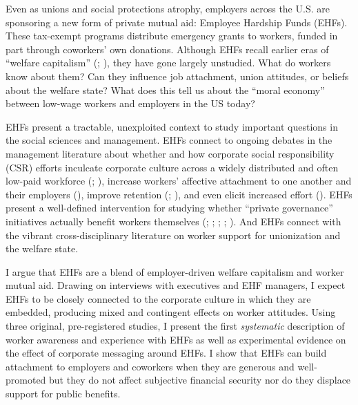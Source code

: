 \documentclass[
  11pt,
  oneside]{article}
\begin{document}
Even as unions and social protections atrophy, employers across the U.S. are sponsoring a new form of private mutual aid: Employee Hardship Funds (EHFs). These tax-exempt programs distribute emergency grants to workers, funded in part through coworkers' own donations. Although EHFs recall earlier eras of ``welfare capitalism'' (; ), they have gone largely unstudied. What do workers know about them? Can they influence job attachment, union attitudes, or beliefs about the welfare state? What does this tell us about the ``moral economy'' between low-wage workers and employers in the US today?

EHFs present a tractable, unexploited context to study important questions in the social sciences and management. EHFs connect to ongoing debates in the management literature about whether and how corporate social responsibility (CSR) efforts inculcate corporate culture across a widely distributed and often low-paid workforce (; ), increase workers' affective attachment to one another and their employers (), improve retention (; ), and even elicit increased effort (). EHFs present a well-defined intervention for studying whether ``private governance'' initiatives actually benefit workers themselves (; ; ; ; ). And EHFs connect with the vibrant cross-disciplinary literature on worker support for unionization and the welfare state.

I argue that EHFs are a blend of employer-driven welfare capitalism and worker mutual aid. Drawing on interviews with executives and EHF managers, I expect EHFs to be closely connected to the corporate culture in which they are embedded, producing mixed and contingent effects on worker attitudes. Using three original, pre-registered studies, I present the first \emph{systematic} description of worker awareness and experience with EHFs as well as experimental evidence on the effect of corporate messaging around EHFs. I show that EHFs can build attachment to employers and coworkers when they are generous and well-promoted but they do not affect subjective financial security nor do they displace support for public benefits.
\end{document}
